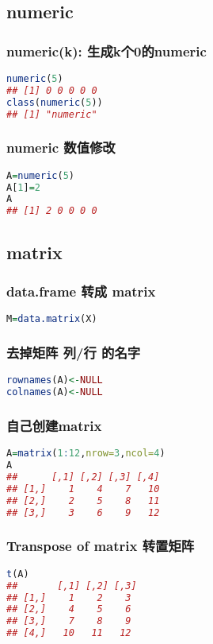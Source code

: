 \documentclass[11pt,a4paper]{article}
\begin{document}
\subsection{numeric}
\subsubsection{numeric(k): 生成k个0的numeric}
\begin{lstlisting}[language=R]
numeric(5)
## [1] 0 0 0 0 0
class(numeric(5))
## [1] "numeric"
\end{lstlisting}
\subsubsection{numeric 数值修改}
\begin{lstlisting}[language=R]
A=numeric(5)
A[1]=2
A
## [1] 2 0 0 0 0
\end{lstlisting}
\subsection{matrix}
\subsubsection{data.frame 转成 matrix}
\begin{lstlisting}[language=R]
M=data.matrix(X)
\end{lstlisting}

\subsubsection{去掉矩阵 列/行 的名字}

\begin{lstlisting}[language=R]
rownames(A)<-NULL
colnames(A)<-NULL
\end{lstlisting}

\subsubsection{自己创建matrix}
\begin{lstlisting}[language=R]
A=matrix(1:12,nrow=3,ncol=4)
A
##      [,1] [,2] [,3] [,4]
## [1,]    1    4    7   10
## [2,]    2    5    8   11
## [3,]    3    6    9   12
\end{lstlisting}
\subsubsection{Transpose of matrix 转置矩阵}
\begin{lstlisting}[language=R]
t(A)
##       [,1] [,2] [,3]
## [1,]    1    2    3
## [2,]    4    5    6
## [3,]    7    8    9
## [4,]   10   11   12
\end{lstlisting}
\end{document}
